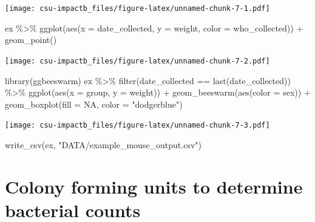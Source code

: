 \documentclass[
]{book}
\newenvironment{Shaded}{\begin{snugshade}}{\end{snugshade}}
\newcommand{\AttributeTok}[1]{\textcolor[rgb]{0.77,0.63,0.00}{#1}}
\newcommand{\ConstantTok}[1]{\textcolor[rgb]{0.00,0.00,0.00}{#1}}
\newcommand{\FunctionTok}[1]{\textcolor[rgb]{0.00,0.00,0.00}{#1}}
\newcommand{\NormalTok}[1]{#1}
\newcommand{\SpecialCharTok}[1]{\textcolor[rgb]{0.00,0.00,0.00}{#1}}
\newcommand{\StringTok}[1]{\textcolor[rgb]{0.31,0.60,0.02}{#1}}
\begin{document}
\texttt{[image: csu-impactb\_files/figure-latex/unnamed-chunk-7-1.pdf]}

\begin{Shaded}
\begin{Highlighting}[]
\NormalTok{ex }\SpecialCharTok{\%\textgreater{}\%} 
  \FunctionTok{ggplot}\NormalTok{(}\FunctionTok{aes}\NormalTok{(}\AttributeTok{x =}\NormalTok{ date\_collected, }\AttributeTok{y =}\NormalTok{ weight, }\AttributeTok{color =}\NormalTok{ who\_collected)) }\SpecialCharTok{+} \FunctionTok{geom\_point}\NormalTok{()}
\end{Highlighting}
\end{Shaded}

\texttt{[image: csu-impactb\_files/figure-latex/unnamed-chunk-7-2.pdf]}

\begin{Shaded}
\begin{Highlighting}[]
\FunctionTok{library}\NormalTok{(ggbeeswarm)}
\NormalTok{ex }\SpecialCharTok{\%\textgreater{}\%} 
  \FunctionTok{filter}\NormalTok{(date\_collected }\SpecialCharTok{==} \FunctionTok{last}\NormalTok{(date\_collected)) }\SpecialCharTok{\%\textgreater{}\%} 
  \FunctionTok{ggplot}\NormalTok{(}\FunctionTok{aes}\NormalTok{(}\AttributeTok{x =}\NormalTok{ group, }\AttributeTok{y =}\NormalTok{ weight)) }\SpecialCharTok{+} 
  \FunctionTok{geom\_beeswarm}\NormalTok{(}\FunctionTok{aes}\NormalTok{(}\AttributeTok{color =}\NormalTok{ sex)) }\SpecialCharTok{+} 
  \FunctionTok{geom\_boxplot}\NormalTok{(}\AttributeTok{fill =} \ConstantTok{NA}\NormalTok{, }\AttributeTok{color =} \StringTok{"dodgerblue"}\NormalTok{)}
\end{Highlighting}
\end{Shaded}

\texttt{[image: csu-impactb\_files/figure-latex/unnamed-chunk-7-3.pdf]}

\begin{Shaded}
\begin{Highlighting}[]
\FunctionTok{write\_csv}\NormalTok{(ex, }\StringTok{"DATA/example\_mouse\_output.csv"}\NormalTok{)}
\end{Highlighting}
\end{Shaded}

\hypertarget{colony-forming-units-to-determine-bacterial-counts}{%
\chapter{Colony forming units to determine bacterial counts}\label{colony-forming-units-to-determine-bacterial-counts}}
\end{document}
